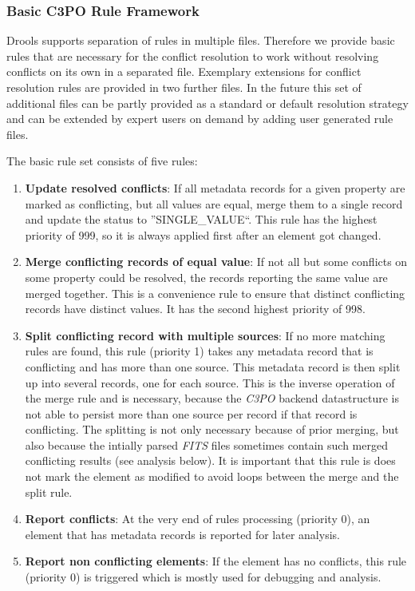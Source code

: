 \documentclass[a4paper,12pt]{article}
\begin{document}
\subsubsection{Basic C3PO Rule Framework}
Drools supports separation of rules in multiple files. Therefore we provide basic rules that are necessary for the conflict resolution to work without resolving conflicts on its own in a separated file. Exemplary extensions for conflict resolution rules are provided in two further files. In the future this set of additional files can be partly provided as a standard or default resolution strategy and can be extended by expert users on demand by adding user generated rule files.

The basic rule set consists of five rules:
\begin{enumerate}
 \item \textbf{Update resolved conflicts}: If all metadata records for a given property are marked as conflicting, but all values are equal, merge them to a single record and update the status to ''SINGLE\_VALUE``. This rule has the highest priority of 999, so it is always applied first after an element got changed.
 \item \textbf{Merge conflicting records of equal value}: If not all but some conflicts on some property could be resolved, the records reporting the same value are merged together. This is a convenience rule to ensure that distinct conflicting records have distinct values. It has the second highest priority of 998.
 \item \textbf{Split conflicting record with multiple sources}: If no more matching rules are found, this rule (priority 1) takes any metadata record that is conflicting and has more than one source. This metadata record is then split up into several records, one for each source. This is the inverse operation of the merge rule and is necessary, because the \emph{C3PO} backend datastructure is not able to persist more than one source per record if that record is conflicting. The splitting is not only necessary because of prior merging, but also because the intially parsed \emph{FITS} files sometimes contain such merged conflicting results (see analysis below). It is important that this rule is does not mark the element as modified to avoid loops between the merge and the split rule.
 \item \textbf{Report conflicts}: At the very end of rules processing (priority 0), an element that has metadata records is reported for later analysis.
 \item \textbf{Report non conflicting elements}: If the element has no conflicts, this rule (priority 0) is triggered which is mostly used for debugging and analysis.
\end{enumerate}
\end{document}
